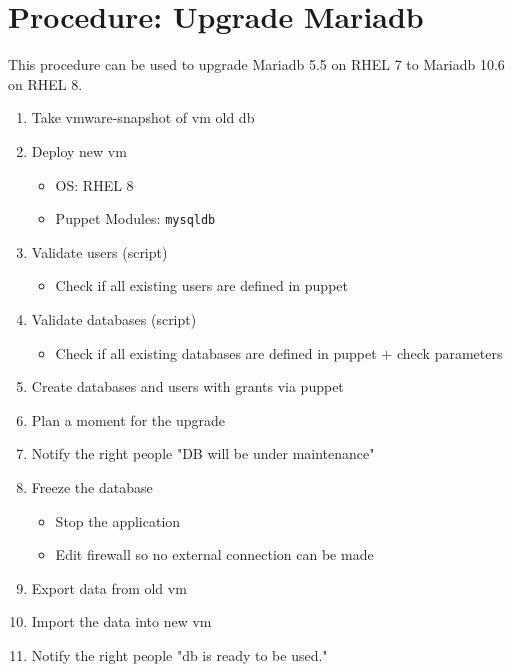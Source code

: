 
\section{Procedure: Upgrade Mariadb}
\label{sec:upgrade-mariadb}

This procedure can be used to upgrade Mariadb 5.5 on RHEL 7 to Mariadb 10.6 on RHEL 8.

\begin{enumerate}
    \item Take vmware-snapshot of vm old db
    \item Deploy new vm
    \begin{itemize}
        \item OS: RHEL 8
        \item Puppet Modules: \verb*|mysqldb|
    \end{itemize}
    \item Validate users (script)
     \begin{itemize}
        \item Check if all existing users are defined in puppet
    \end{itemize}
    \item Validate databases (script)
    \begin{itemize}
        \item Check if all existing databases are defined in puppet + check parameters
    \end{itemize}
    \item Create databases and users with grants via puppet
    \item Plan a moment for the upgrade
    \item Notify the right people "DB will be under maintenance"
    \item Freeze the database
    \begin{itemize}
        \item Stop the application
        \item Edit firewall so no external connection can be made
    \end{itemize}
    \item Export data from old vm
    \item Import the data into new vm
    \item Notify the right people "db is ready to be used."

\end{enumerate}
